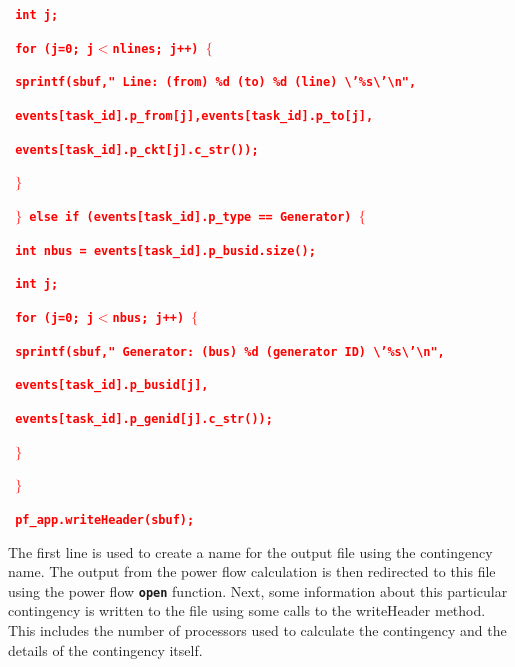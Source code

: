 \documentclass[12pt]{report} %
\begin{document}
\textcolor{red}{\texttt{\textbf{      int j;}}}

\textcolor{red}{\texttt{\textbf{      for (j=0; j$\boldsymbol{\mathrm{<}}$nlines; j++) $\boldsymbol{\mathrm{\{}}$}}}

\textcolor{red}{\texttt{\textbf{        sprintf(sbuf," Line: (from) \%d (to) \%d (line) {\textbackslash}'\%s{\textbackslash}'{\textbackslash}n",}}}

\textcolor{red}{\texttt{\textbf{            events[task\_id].p\_from[j],events[task\_id].p\_to[j],}}}

\textcolor{red}{\texttt{\textbf{            events[task\_id].p\_ckt[j].c\_str());}}}

\textcolor{red}{\texttt{\textbf{      $\boldsymbol{\mathrm{\}}}$}}}

\textcolor{red}{\texttt{\textbf{    $\boldsymbol{\mathrm{\}}}$ else if (events[task\_id].p\_type == Generator) $\boldsymbol{\mathrm{\{}}$}}}

\textcolor{red}{\texttt{\textbf{      int nbus = events[task\_id].p\_busid.size();}}}

\textcolor{red}{\texttt{\textbf{      int j;}}}

\textcolor{red}{\texttt{\textbf{      for (j=0; j$\boldsymbol{\mathrm{<}}$nbus; j++) $\boldsymbol{\mathrm{\{}}$}}}

\textcolor{red}{\texttt{\textbf{        sprintf(sbuf," Generator: (bus) \%d (generator ID) {\textbackslash}'\%s{\textbackslash}'{\textbackslash}n",}}}

\textcolor{red}{\texttt{\textbf{        events[task\_id].p\_busid[j],}}}

\textcolor{red}{\texttt{\textbf{        events[task\_id].p\_genid[j].c\_str());}}}

\textcolor{red}{\texttt{\textbf{      $\boldsymbol{\mathrm{\}}}$}}}

\textcolor{red}{\texttt{\textbf{    $\boldsymbol{\mathrm{\}}}$}}}

\textcolor{red}{\texttt{\textbf{    pf\_app.writeHeader(sbuf);}}}

The first line is used to create a name for the output file using the contingency name. The output from the power flow calculation is then redirected to this file using the power flow \texttt{\textbf{open}} function. Next, some information about this particular contingency is written to the file using some calls to the writeHeader method. This includes the number of processors used to calculate the contingency and the details of the contingency itself.
\end{document}
